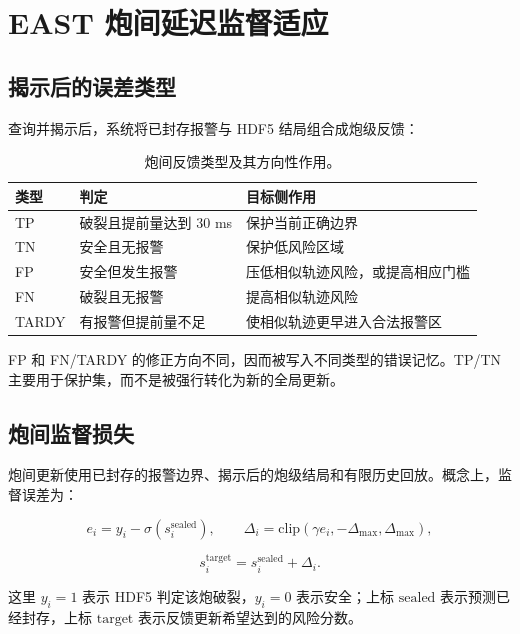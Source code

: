 \documentclass[11pt,a4paper]{article}
\begin{document}
\section{EAST 炮间延迟监督适应}

\subsection{揭示后的误差类型}

查询并揭示后，系统将已封存报警与 HDF5 结局组合成炮级反馈：

\begin{table}[H]
\centering
\caption{炮间反馈类型及其方向性作用。}
\begin{tabularx}{\textwidth}{l l Y}
\toprule
类型 & 判定 & 目标侧作用\\
\midrule
TP & 破裂且提前量达到 30 ms & 保护当前正确边界\\
TN & 安全且无报警 & 保护低风险区域\\
FP & 安全但发生报警 & 压低相似轨迹风险，或提高相应门槛\\
FN & 破裂且无报警 & 提高相似轨迹风险\\
TARDY & 有报警但提前量不足 & 使相似轨迹更早进入合法报警区\\
\bottomrule
\end{tabularx}
\end{table}

FP 和 FN/TARDY 的修正方向不同，因而被写入不同类型的错误记忆。TP/TN 主要用于保护集，而不是被强行转化为新的全局更新。

\subsection{炮间监督损失}

炮间更新使用已封存的报警边界、揭示后的炮级结局和有限历史回放。概念上，监督误差为：

\begin{equation}
e_i=y_i-\sigma(s_i^{\mathrm{sealed}}),
\qquad
\Delta_i=\mathrm{clip}
(\gamma e_i,-\Delta_{\max},\Delta_{\max}),
\label{eq:sealed-error}
\end{equation}

\begin{equation}
s_i^{\mathrm{target}}
=s_i^{\mathrm{sealed}}+\Delta_i.
\label{eq:sealed-target}
\end{equation}

这里 \(y_i=1\) 表示 HDF5 判定该炮破裂，\(y_i=0\) 表示安全；上标 \(\mathrm{sealed}\) 表示预测已经封存，上标 \(\mathrm{target}\) 表示反馈更新希望达到的风险分数。
\end{document}
